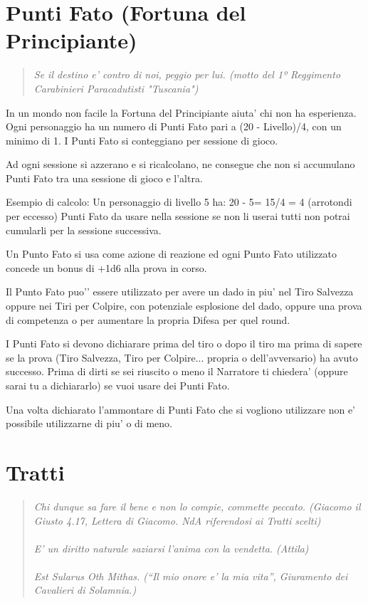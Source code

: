 \documentclass[a4paper,11pt,twoside,openany]{book}
\begin{document}
	
	\section{Punti Fato (Fortuna del Principiante)}
	\begin{quote}\textit{Se il destino e' contro di noi, peggio per lui. (motto del 1º Reggimento Carabinieri Paracadutisti "Tuscania")
	}\end{quote}
	
	In un mondo non facile la Fortuna del Principiante aiuta’ chi non ha esperienza.
	Ogni personaggio ha un numero di Punti Fato pari a (20 - Livello)/4, con un minimo di 1. I Punti Fato si conteggiano per sessione di gioco. 
	
	Ad ogni sessione si azzerano e si ricalcolano, ne consegue che non si accumulano Punti Fato tra una sessione di gioco e l’altra.
	
	Esempio di calcolo:
	Un personaggio di livello 5 ha: 20 - 5= 15/4 = 4 (arrotondi per eccesso) Punti Fato da usare nella sessione se non li userai tutti non potrai cumularli per la sessione successiva.
	
	Un Punto Fato si usa come azione di reazione ed ogni Punto Fato utilizzato concede un bonus di +1d6 alla prova in corso. 
	
	Il Punto Fato puo'’ essere utilizzato per avere un dado in piu' nel Tiro Salvezza oppure nei Tiri per Colpire, con potenziale esplosione del dado, oppure una prova di competenza o per aumentare la propria Difesa per quel round.
	
	I Punti Fato si devono dichiarare prima del tiro o dopo il tiro ma prima di sapere se la prova (Tiro Salvezza, Tiro per Colpire... propria o dell’avversario) ha avuto successo. 
	Prima di dirti se sei riuscito o meno il Narratore ti chiedera’ (oppure sarai tu a dichiararlo) se vuoi usare dei Punti Fato.
	
	Una volta dichiarato l’ammontare di Punti Fato che si vogliono utilizzare non e’ possibile utilizzarne di piu' o di meno.
	
	\section{Tratti}
	
	\label{tratti}
	\begin{quote}\textit{
			Chi dunque sa fare il bene e non lo compie, commette peccato. (Giacomo il Giusto 4.17, Lettera di Giacomo. NdA riferendosi ai Tratti scelti)\\\\
			E' un diritto naturale saziarsi l'anima con la vendetta. (Attila)\\\\
			Est Sularus Oth Mithas. (“Il mio onore e' la mia vita”, Giuramento dei Cavalieri di Solamnia.)}\end{quote}
	
\end{document}
